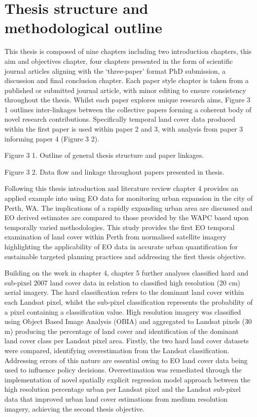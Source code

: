\documentclass[]{book}
\begin{document}
\section{Thesis structure and methodological
outline}\label{thesis-structure-and-methodological-outline}

This thesis is composed of nine chapters including two introduction
chapters, this aim and objectives chapter, four chapters presented in
the form of scientific journal articles aligning with the `three-paper'
format PhD submission, a discussion and final conclusion chapter. Each
paper style chapter is taken from a published or submitted journal
article, with minor editing to ensure consistency throughout the thesis.
Whilst each paper explores unique research aims, Figure 3 1 outlines
inter-linkages between the collective papers forming a coherent body of
novel research contributions. Specifically temporal land cover data
produced within the first paper is used within paper 2 and 3, with
analysis from paper 3 informing paper 4 (Figure 3 2).

Figure 3 1. Outline of general thesis structure and paper linkages.

Figure 3 2. Data flow and linkage throughout papers presented in thesis.

Following this thesis introduction and literature review chapter 4
provides an applied example into using EO data for monitoring urban
expansion in the city of Perth, WA. The implications of a rapidly
expanding urban area are discussed and EO derived estimates are compared
to those provided by the WAPC based upon temporally varied
methodologies. This study provides the first EO temporal examination of
land cover within Perth from normalised satellite imagery highlighting
the applicability of EO data in accurate urban quantification for
sustainable targeted planning practices and addressing the first thesis
objective.

Building on the work in chapter 4, chapter 5 further analyses classified
hard and sub-pixel 2007 land cover data in relation to classified high
resolution (20 cm) aerial imagery. The hard classification refers to the
dominant land cover within each Landsat pixel, whilst the sub-pixel
classification represents the probability of a pixel containing a
classification value. High resolution imagery was classified using
Object Based Image Analysis (OBIA) and aggregated to Landsat pixels (30
m) producing the percentage of land cover and identification of the
dominant land cover class per Landsat pixel area. Firstly, the two hard
land cover datasets were compared, identifying overestimation from the
Landsat classification. Addressing errors of this nature are essential
owing to EO land cover data being used to influence policy decisions.
Overestimation was remediated through the implementation of novel
spatially explicit regression model approach between the high resolution
percentage urban per Landsat pixel and the Landsat sub-pixel data that
improved urban land cover estimations from medium resolution imagery,
achieving the second thesis objective.
\end{document}
